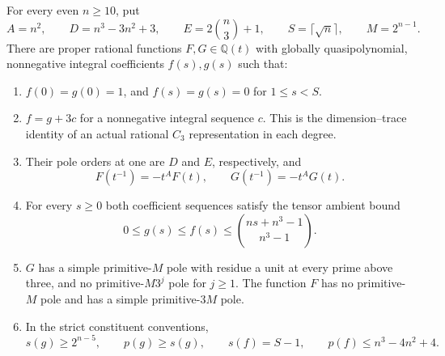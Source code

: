 \begin{theorem}
For every even $n\ge10$, put
\[
 A=n^2,\qquad D=n^3-3n^2+3,\qquad E=2\binom n3+1,
 \qquad S=\lceil\sqrt n\rceil,\qquad M=2^{n-1}.
 \tag{PNEW-Q1}
\]
There are proper rational functions $F,G\in\mathbb Q(t)$ with globally
quasipolynomial, nonnegative integral coefficients $f(s),g(s)$ such that:
\begin{enumerate}
\item $f(0)=g(0)=1$, and $f(s)=g(s)=0$ for $1\le s<S$.
\item $f=g+3c$ for a nonnegative integral sequence $c$. This is the
dimension--trace identity of an actual rational $C_3$ representation
in each degree.
\item Their pole orders at one are $D$ and $E$, respectively, and
\[
 F(t^{-1})=-t^A F(t),\qquad G(t^{-1})=-t^A G(t).
 \tag{PNEW-Q2}
\]
\item For every $s\ge0$ both coefficient sequences satisfy the tensor
ambient bound
\[
        0\le g(s)\le f(s)\le\binom{ns+n^3-1}{n^3-1}.
 \tag{PNEW-Q3}
\]
\item $G$ has a simple primitive-$M$ pole with residue a unit at
every prime above three, and no primitive-$M3^j$ pole for $j\ge1$.
The function $F$ has no primitive-$M$ pole and has a simple
primitive-$3M$ pole.
\item In the strict constituent conventions,
\[
 s(g)\ge 2^{n-5},\qquad p(g)\ge s(g),\qquad
 s(f)=S-1,\qquad p(f)\le n^3-4n^2+4.
 \tag{PNEW-Q4}
\]
\end{enumerate}
\end{theorem}
